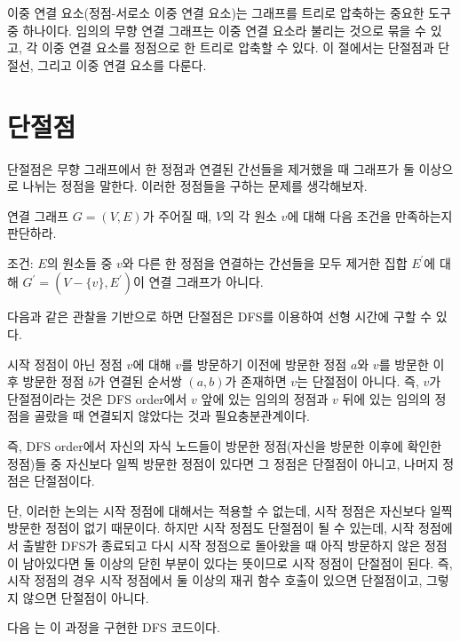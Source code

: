 이중 연결 요소(정점-서로소 이중 연결 요소)는 그래프를 트리로 압축하는 중요한 도구 중 하나이다. 임의의 무향 연결 그래프는 이중 연결 요소라 불리는 것으로 묶을 수 있고, 각 이중 연결 요소를 정점으로 한 트리로 압축할 수 있다. 이 절에서는 단절점과 단절선, 그리고 이중 연결 요소를 다룬다.

\section{단절점}
단절점은 무향 그래프에서 한 정점과 연결된 간선들을 제거했을 때 그래프가 둘 이상으로 나뉘는 정점을 말한다. 이러한 정점들을 구하는 문제를 생각해보자.

\begin{example} \label{ex: articulation-point}
    연결 그래프 $G=(V, E)$가 주어질 때, $V$의 각 원소 $v$에 대해 다음 조건을 만족하는지 판단하라.

    조건: $E$의 원소들 중 $v$와 다른 한 정점을 연결하는 간선들을 모두 제거한 집합 $E^\prime$에 대해 $G^\prime = (V - \{ v \}, E^\prime)$이 연결 그래프가 아니다.
\end{example}

다음과 같은 관찰을 기반으로 하면 단절점은 DFS를 이용하여 선형 시간에 구할 수 있다.

\begin{obs}
    시작 정점이 아닌 정점 $v$에 대해 $v$를 방문하기 이전에 방문한 정점 $a$와 $v$를 방문한 이후 방문한 정점 $b$가 연결된 순서쌍 $(a, b)$가 존재하면 $v$는 단절점이 아니다. 즉, $v$가 단절점이라는 것은 DFS order에서 $v$ 앞에 있는 임의의 정점과 $v$ 뒤에 있는 임의의 정점을 골랐을 때 연결되지 않았다는 것과 필요충분관계이다.
\end{obs}

즉, DFS order에서 자신의 자식 노드들이 방문한 정점(자신을 방문한 이후에 확인한 정점)들 중 자신보다 일찍 방문한 정점이 있다면 그 정점은 단절점이 아니고, 나머지 정점은 단절점이다.

단, 이러한 논의는 시작 정점에 대해서는 적용할 수 없는데, 시작 정점은 자신보다 일찍 방문한 정점이 없기 때문이다. 
하지만 시작 정점도 단절점이 될 수 있는데, 시작 정점에서 출발한 DFS가 종료되고 다시 시작 정점으로 돌아왔을 때 아직 방문하지 않은 정점이 남아있다면 둘 이상의 닫힌 부분이 있다는 뜻이므로 시작 정점이 단절점이 된다. 즉, 시작 정점의 경우 시작 정점에서 둘 이상의 재귀 함수 호출이 있으면 단절점이고, 그렇지 않으면 단절점이 아니다.

다음 는 이 과정을 구현한 DFS 코드이다.

